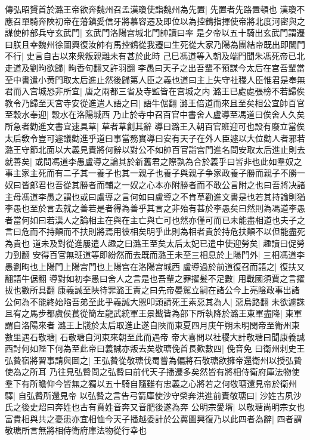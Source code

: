 傳弘昭贇首於潞王帝欲奔魏州召孟漢瓊使詣魏州為先置|{
	先置者先路置頓也}
漢瓊不應召單騎奔陜初帝在藩鎮愛信牙將慕容遷及即位以為控鶴指揮使帝將北度河密與之謀使帥部兵守玄武門|{
	玄武門洛陽宫城北門帥讀曰率}
是夕帝以五十騎出玄武門謂遷曰朕且幸魏州徐圖興復汝帥有馬控鶴從我遷曰生死從大家乃陽為團結帝既出即闔門不行|{
	史言自古以來衆叛親離未有甚於此時}
己巳馮道等入朝及端門聞朱馮死帝已北走道及劉昫欲歸|{
	昫香句翻又許羽翻}
李愚曰天子之出吾輩不預謀今太后在宫吾輩當至中書遣小黄門取太后進止然後歸第人臣之義也道曰主上失守社稷人臣惟君是奉無君而入宫城恐非所宜|{
	唐之兩都三省及寺監皆在宫城之内}
潞王已處處張榜不若歸俟教令乃歸至天宮寺安從進遣人語之曰|{
	語牛倨翻}
潞王倍道而來且至矣相公宜帥百官至穀水奉迎|{
	穀水在洛陽城西}
乃止於寺中召百官中書舍人盧導至馮道曰俟舍人久矣所急者勸進文書宜速具草|{
	草者草創其辭}
導曰潞王入朝百官班迎可也設有廢立當俟太后敎令豈可遽議勸進乎道曰事當務實導曰安有天子在外人臣遽以大位勸人者邪若潞王守節北面以大義見責將何辭以對公不如帥百官詣宫門進名問安取太后進止則去就善矣|{
	或問馮道李愚盧導之論其於新舊君之際孰為合於義乎曰皆非也此如羣奴之事主家主死而有二子其一養子也其一親子也養子與親子争家政養子勝而親子不勝一奴曰皆郎君也吾從其勝者而輔之一奴之心本亦附勝者而不敢公言附之也曰吾將决諸主母馮道李愚之謂也或曰盧導之言何如曰盧導之不肯草勸進文書是也若其持論則猶李愚也至於言去就之善若是者得為善乎其言之非殆有甚於李愚矣曰然則為馮道李愚者當何如曰若漢人之論相主在與在主亡與亡可也然亦僅可而已未能盡相道也夫子之言曰危而不持顛而不扶則將焉用彼相矣明乎此則為相者貴於持危扶顛不以但能盡死為貴也}
道未及對從進屢遣人趣之曰潞王至矣太后太妃已遣中使迎勞矣|{
	趣讀曰促勞力到翻}
安得百官無班道等即紛然而去既而潞王未至三相息於上陽門外|{
	三相馮道李愚劉昫也上陽門上陽宫門也上陽宫在洛陽宫城西}
盧導過於前道復召而語之|{
	復扶又翻語牛倨翻}
導對如初李愚曰舍人之言是也吾輩之罪擢髪不足數|{
	用戰國須賈之言擢拔也數所具翻}
康義誠至陜待罪潞王責之曰先帝晏駕立嗣在諸公今上亮陰政事出諸公何為不能終始陷吾弟至此乎義誠大愳叩頭請死王素惡其為人|{
	惡烏路翻}
未欲遽誅且宥之馬步都虞侯萇從簡左龍武統軍王景戡皆為部下所執降於潞王東軍盡降|{
	東軍謂自洛陽來者}
潞王上牋於太后取進止遂自陜而東夏四月庚午朔未明閔帝至衛州東數里遇石敬瑭|{
	石敬瑭自河東來朝至此而遇帝}
帝大喜問以社稷大計敬瑭曰聞康義誠西討何如陛下何為至此帝曰義誠亦叛去矣敬瑭俛首長歎數四|{
	俛音免}
曰衛州刺史王弘䞇宿將習事請與圖之|{
	王弘䞇從敬瑭伐蜀嘗為偏將石敬瑭欲擁帝還衛州以授弘䞇使為之所耳}
乃往見弘䞇問之弘䞇曰前代天子播遷多矣然皆有將相侍衛府庫法物使羣下有所瞻仰今皆無之獨以五十騎自隨雖有忠義之心將若之何敬瑭還見帝於衛州驛|{
	自弘䞇所還見帝}
以弘䞇之言告弓箭庫使沙守榮奔洪進前責敬瑭曰|{
	沙姓古夙沙氏之後史炤曰奔姓也古有賁姓音奔又音肥後遂為奔}
公明宗愛壻|{
	以敬瑭尚明宗女也}
富貴相與共之憂患亦宜相恤今天子播越委計於公冀圖興復乃以此四者為辭|{
	四者謂敬瑭所言無將相侍衛府庫法物從行幸也}
